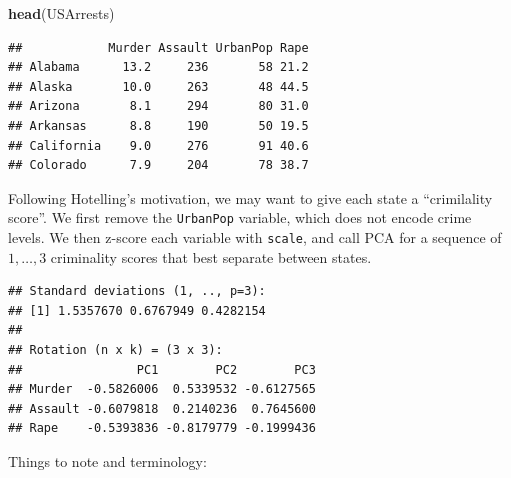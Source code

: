 \documentclass[]{book}
\newenvironment{Shaded}{\begin{snugshade}}{\end{snugshade}}
\newcommand{\KeywordTok}[1]{\textcolor[rgb]{0.13,0.29,0.53}{\textbf{#1}}}
\newcommand{\DataTypeTok}[1]{\textcolor[rgb]{0.13,0.29,0.53}{#1}}
\newcommand{\DecValTok}[1]{\textcolor[rgb]{0.00,0.00,0.81}{#1}}
\newcommand{\StringTok}[1]{\textcolor[rgb]{0.31,0.60,0.02}{#1}}
\newcommand{\OtherTok}[1]{\textcolor[rgb]{0.56,0.35,0.01}{#1}}
\newcommand{\OperatorTok}[1]{\textcolor[rgb]{0.81,0.36,0.00}{\textbf{#1}}}
\newcommand{\NormalTok}[1]{#1}
\theoremstyle{definition}
\theoremstyle{definition}
\theoremstyle{definition}
\theoremstyle{remark}
\begin{document}
\begin{Shaded}
\begin{Highlighting}[]
\KeywordTok{head}\NormalTok{(USArrests)}
\end{Highlighting}
\end{Shaded}

\begin{verbatim}
##            Murder Assault UrbanPop Rape
## Alabama      13.2     236       58 21.2
## Alaska       10.0     263       48 44.5
## Arizona       8.1     294       80 31.0
## Arkansas      8.8     190       50 19.5
## California    9.0     276       91 40.6
## Colorado      7.9     204       78 38.7
\end{verbatim}

Following Hotelling's motivation, we may want to give each state a
``crimilality score''. We first remove the \texttt{UrbanPop} variable,
which does not encode crime levels. We then z-score each variable with
\texttt{scale}, and call PCA for a sequence of \(1,\dots,3\) criminality
scores that best separate between states.

\begin{Shaded}
\end{Shaded}

\begin{verbatim}
## Standard deviations (1, .., p=3):
## [1] 1.5357670 0.6767949 0.4282154
## 
## Rotation (n x k) = (3 x 3):
##                PC1        PC2        PC3
## Murder  -0.5826006  0.5339532 -0.6127565
## Assault -0.6079818  0.2140236  0.7645600
## Rape    -0.5393836 -0.8179779 -0.1999436
\end{verbatim}

Things to note and terminology:
\end{document}
